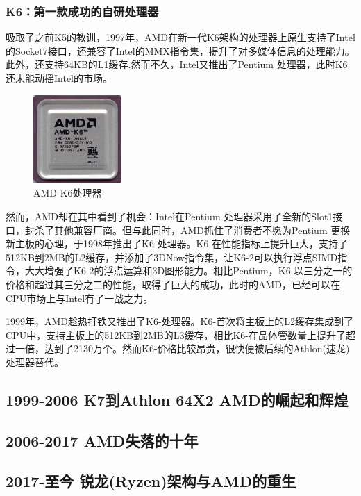 \documentclass[UTF8]{ctexart}
\begin{document}
\subsubsection{K6：第一款成功的自研处理器}
吸取了之前K5的教训，1997年，AMD在新一代K6架构的处理器上原生支持了Intel的Socket7接口，还兼容了Intel的MMX指令集，提升了对多媒体信息的处理能力。此外，还支持64KB的L1缓存.然而不久，Intel又推出了Pentium \uppercase\expandafter{}处理器，此时K6还未能动摇Intel的市场。
\begin{figure}[H]
    \begin{center}
        \includegraphics[width=0.3\textwidth]{figure/K6.jpg}
        \caption{AMD K6处理器}
    \end{center}
\end{figure}
然而，AMD却在其中看到了机会：Intel在Pentium \uppercase\expandafter{}处理器采用了全新的Slot1接口，封杀了其他兼容厂商。但与此同时，AMD抓住了消费者不愿为Pentium \uppercase\expandafter{}更换新主板的心理，于1998年推出了K6-\uppercase\expandafter{}处理器。K6-\uppercase\expandafter{}在性能指标上提升巨大，支持了512KB到2MB的L2缓存，并添加了3DNow指令集，让K6-2可以执行浮点SIMD指令，大大增强了K6-2的浮点运算和3D图形能力。相比Pentium\uppercase\expandafter{}，K6-\uppercase\expandafter{}以三分之一的价格和超过其三分之二的性能，取得了巨大的成功，此时的AMD，已经可以在CPU市场上与Intel有了一战之力。

1999年，AMD趁热打铁又推出了K6-\uppercase\expandafter{}处理器。K6-\uppercase\expandafter{}首次将主板上的L2缓存集成到了CPU中，支持主板上的512KB到2MB的L3缓存，相比K6-\uppercase\expandafter{}在晶体管数量上提升了超过一倍，达到了2130万个。然而K6-\uppercase\expandafter{}价格比较昂贵，很快便被后续的Athlon(速龙)处理器替代。


\subsection{1999-2006 K7到Athlon 64X2 AMD的崛起和辉煌}


\subsection{2006-2017 AMD失落的十年}
\subsection{2017-至今 锐龙(Ryzen)架构与AMD的重生}
\end{document}

